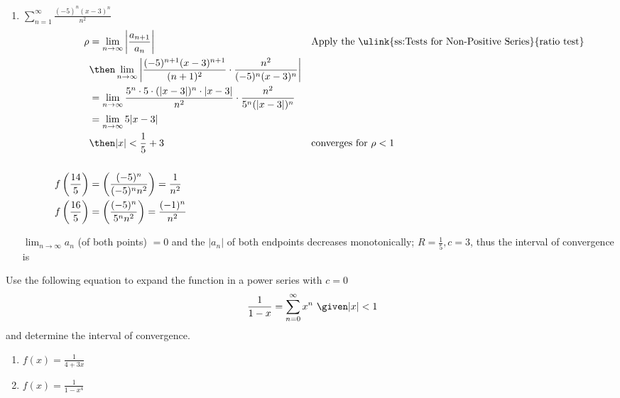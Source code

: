 \begin{enumerate}[itemsep=24em]
\newpage %

  \item \(\displaystyle \sum_{n=1}^{\infty} \frac{(-5)^n(x-3)^n}{n^2} \)
    \begin{align*}
      \rho &= \lim_{n \to \infty} \left| \frac{a_{n+1}}{a_n}  \right|
           && \text{Apply the \ulink{ss:Tests for Non-Positive Series}{ratio test}} \\
      &\then \lim_{n \to \infty} \left|
      \frac{(-5)^{n+1} (x-3)^{n+1}}{(n+1)^2} \cdot
      \frac{n^2}{(-5)^n(x-3)^n}
      \right| \\
      &= \lim_{n \to \infty}
      \frac{5^n\cdot 5 \cdot (|x-3|)^{n} \cdot |x-3|}{n^2} \cdot
      \frac{n^2}{5^n(|x-3|)^n} \\
      &=\lim_{n \to \infty} 5|x-3| \\
      &\then |x| < \frac{1}{5} + 3
      && \text{converges for}~\rho < 1 \\
      \\
      f\left(\frac{14}{5}\right) &= \left(\frac{(-5)^n}{(-5)^n n^2}\right) = \frac{1}{n^2}
      \\
      f\left(\frac{16}{5}\right) &= \left(\frac{(-5)^n}{5^n n^2}\right) = \frac{(-1)^n}{n^2}
    \end{align*}

    \(\lim_{n \to \infty}  a_n\) (of both points) \(= 0\) and the \(|a_n|\) of both
    endpoints decreases monotonically; \(R = \frac{1}{5}, c = 3\), thus the
    interval of convergence is 


\end{enumerate}

\newpage %

Use the following equation to expand the function in a power series with \(c =
0\) \[~\displaystyle \frac{1}{1-x} =
\sum_{n=0}^{\infty} x^n ~\given |x| < 1 \]
and determine the interval of convergence.

\begin{enumerate}[itemsep=24em, resume]

  \item  \(\displaystyle f(x) = \frac{1}{4+3x} \)

  \item  \(\displaystyle f(x) = \frac{1}{1-x^4} \)
\end{enumerate}
\newpage %

